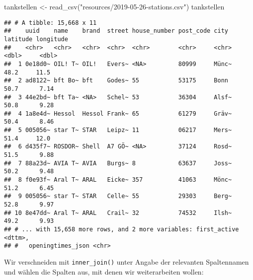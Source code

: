 \documentclass[11pt,german,a4paper]{article}
\newenvironment{Shaded}{\begin{snugshade}}{\end{snugshade}}
\newcommand{\FunctionTok}[1]{\textcolor[rgb]{0.00,0.00,0.00}{#1}}
\newcommand{\NormalTok}[1]{#1}
\newcommand{\OtherTok}[1]{\textcolor[rgb]{0.56,0.35,0.01}{#1}}
\newcommand{\StringTok}[1]{\textcolor[rgb]{0.31,0.60,0.02}{#1}}
\begin{document}
\begin{Shaded}
\begin{Highlighting}[]
\NormalTok{tankstellen }\OtherTok{\textless{}{-}} \FunctionTok{read\_csv}\NormalTok{(}\StringTok{"resources/2019{-}05{-}26{-}stations.csv"}\NormalTok{)}
\NormalTok{tankstellen}
\end{Highlighting}
\end{Shaded}

\begin{verbatim}
## # A tibble: 15,668 x 11
##    uuid    name    brand  street house_number post_code city  latitude longitude
##    <chr>   <chr>   <chr>  <chr>  <chr>        <chr>     <chr>    <dbl>     <dbl>
##  1 0e18d0~ OIL! T~ OIL!   Evers~ <NA>         80999     Münc~     48.2     11.5 
##  2 ad8122~ bft Bo~ bft    Godes~ 55           53175     Bonn      50.7      7.14
##  3 44e2bd~ bft Ta~ <NA>   Schel~ 53           36304     Alsf~     50.8      9.28
##  4 1a8e4d~ Hessol  Hessol Frank~ 65           61279     Gräv~     50.4      8.46
##  5 005056~ star T~ STAR   Leipz~ 11           06217     Mers~     51.4     12.0 
##  6 d435f7~ ROSDOR~ Shell  A7 GÖ~ <NA>         37124     Rosd~     51.5      9.88
##  7 88a23d~ AVIA T~ AVIA   Burgs~ 8            63637     Joss~     50.2      9.48
##  8 f0e93f~ Aral T~ ARAL   Eicke~ 357          41063     Mönc~     51.2      6.45
##  9 005056~ star T~ STAR   Celle~ 55           29303     Berg~     52.8      9.97
## 10 8e47dd~ Aral T~ ARAL   Crail~ 32           74532     Ilsh~     49.2      9.93
## # ... with 15,658 more rows, and 2 more variables: first_active <dttm>,
## #   openingtimes_json <chr>
\end{verbatim}

Wir verschneiden mit \texttt{inner\_join()} unter Angabe der relevanten Spaltennamen und wählen die Spalten aus, mit denen wir weiterarbeiten wollen:
\end{document}
